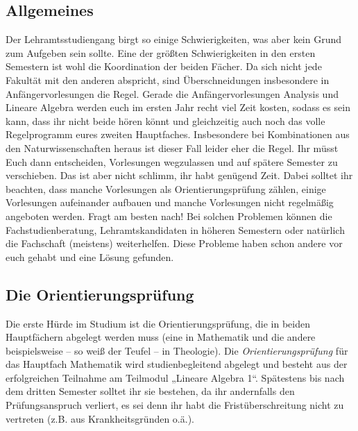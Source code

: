 \newpage{}\vspace*{-3em}%
\subsection{Allgemeines} Der Lehramtsstudiengang birgt so einige Schwierigkeiten, was aber kein Grund zum Aufgeben sein sollte. Eine der größten Schwierigkeiten in den ersten Semestern ist wohl die Koordination der beiden Fächer. Da sich nicht jede Fakultät mit den anderen abspricht, sind Überschneidungen insbesondere in Anfängervorlesungen die Regel. Gerade die Anfängervorlesungen Analysis und Lineare Algebra werden euch im ersten Jahr recht viel Zeit kosten, sodass es sein kann, dass ihr nicht beide hören könnt und gleichzeitig auch noch das volle Regelprogramm eures zweiten Hauptfaches. Insbesondere bei Kombinationen aus den Naturwissenschaften heraus ist dieser Fall leider eher die Regel. Ihr müsst Euch dann entscheiden, Vorlesungen wegzulassen und auf spätere Semester zu verschieben. Das ist aber nicht schlimm, ihr habt genügend Zeit. Dabei solltet ihr beachten, dass manche Vorlesungen als Orientierungsprüfung zählen, einige Vorlesungen aufeinander aufbauen und  manche Vorlesungen nicht regelmäßig angeboten werden. Fragt am besten nach! Bei solchen Problemen können die Fachstudienberatung, Lehramtskandidaten in höheren Semestern oder natürlich die Fachschaft (meistens) weiterhelfen. Diese Probleme haben  schon andere vor euch gehabt und eine Lösung gefunden.

\subsection{Die Orientierungsprüfung} Die erste Hürde im Studium ist die Orientierungsprüfung,  die in beiden Hauptfächern abgelegt werden muss (eine in Mathematik  und die andere beispielsweise -- so weiß der Teufel -- in Theologie).
Die \emph{Orientierungsprüfung} für das Hauptfach Mathematik wird studienbegleitend abgelegt und besteht aus der erfolgreichen Teilnahme am Teilmodul „Lineare Algebra 1“. Spätestens bis nach dem dritten Semester solltet ihr sie bestehen, da ihr andernfalls den Prüfungsanspruch verliert, es sei denn ihr habt die Fristüberschreitung nicht zu vertreten (z.B. aus Krankheitsgründen o.ä.).

